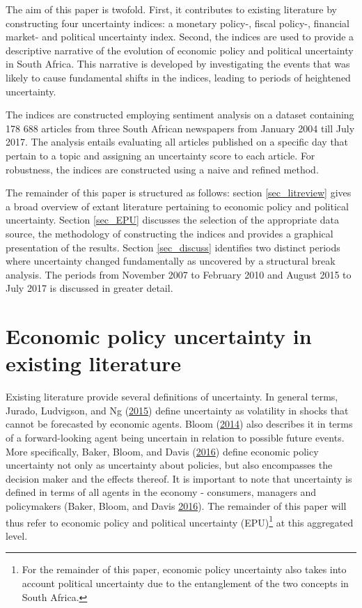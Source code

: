 \documentclass[11pt,preprint, authoryear]{elsarticle}
\numberwithin{equation}{section}
\numberwithin{figure}{section}
\numberwithin{table}{section}
\let\rmarkdownfootnote\footnote%
\def\footnote{\protect\rmarkdownfootnote}
\begin{document}
The aim of this paper is twofold. First, it contributes to existing literature by constructing four uncertainty indices: a monetary policy-, fiscal policy-, financial market- and political uncertainty index. Second, the indices are used to provide a descriptive narrative of the evolution of economic policy and political uncertainty in South Africa. This narrative is developed by investigating the events that was likely to cause fundamental shifts in the indices, leading to periods of heightened uncertainty.

The indices are constructed employing sentiment analysis on a dataset
containing 178 688 articles from three South African newspapers from January 2004 till July 2017. The analysis entails evaluating all articles published on a specific day that pertain to a topic and assigning an uncertainty score to each article. For robustness, the indices are constructed using a naive and refined method.

The remainder of this paper is structured as follows: section \ref{sec_litreview} gives a broad overview of extant literature pertaining to economic policy and political uncertainty. Section \ref{sec_EPU} discusses the selection of the appropriate data source, the methodology of constructing the indices and provides a graphical presentation of the results. Section \ref{sec_discuss} identifies two distinct periods where uncertainty changed fundamentally as uncovered by a structural break analysis. The periods from November 2007 to February 2010 and August 2015 to July 2017 is discussed in greater detail. 

\section{\texorpdfstring{Economic policy uncertainty in existing
literature
\label{sec_litreview}}{Economic policy uncertainty in existing literature }}\label{economic-policy-uncertainty-in-existing-literature}

Existing literature provide several definitions of uncertainty. In
general terms, Jurado, Ludvigson, and Ng
(\protect\hyperlink{ref-Jurado2015}{2015}) define uncertainty as
volatility in shocks that cannot be forecasted by economic agents. Bloom
(\protect\hyperlink{ref-Bloom2014}{2014}) also describes it in terms of a forward-looking agent being uncertain in relation to possible future events. More specifically, Baker, Bloom, and Davis
(\protect\hyperlink{ref-Baker2016}{2016}) define economic policy
uncertainty not only as uncertainty about policies, but also encompasses the decision maker and the effects thereof. It is
important to note that uncertainty is defined in terms of all agents in
the economy - consumers, managers and policymakers (Baker, Bloom, and Davis
\protect\hyperlink{ref-Baker2016}{2016}). The remainder of this paper will thus refer to economic policy and political uncertainty (EPU)\footnote{For the remainder of this paper, economic policy uncertainty also takes into account political uncertainty due to the entanglement of the two concepts in South Africa.} at this aggregated level.
\end{document}

